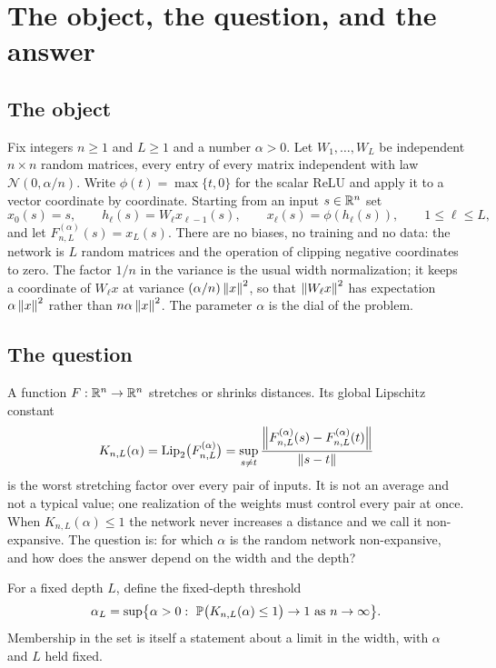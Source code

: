 \section{The object, the question, and the answer}
\label{sec:intro}

\subsection{The object}

Fix integers $n\ge 1$ and $L\ge 1$ and a number $\alpha>0$. Let $W_1,\dots,W_L$ be independent $n\times n$ random matrices, every entry of every matrix independent with law $\mathcal N(0,\alpha/n)$. Write $\phi(t)=\max\{t,0\}$ for the scalar ReLU and apply it to a vector coordinate by coordinate. Starting from an input $s\in\mathbb{R}^n$ set
\begin{equation}\label{eq:forward}
x_0(s)=s,\qquad h_\ell(s)=W_\ell x_{\ell-1}(s),\qquad x_\ell(s)=\phi(h_\ell(s)),\qquad 1\le \ell\le L,
\end{equation}
and let $F^{(\alpha)}_{n,L}(s)=x_L(s)$. There are no biases, no training and no data: the network is $L$ random matrices and the operation of clipping negative coordinates to zero. The factor $1/n$ in the variance is the usual width normalization; it keeps a coordinate of $W_\ell x$ at variance $(\alpha/n)\left\lVert x\right\rVert^2$, so that $\left\lVert W_\ell x\right\rVert^2$ has expectation $\alpha\left\lVert x\right\rVert^2$ rather than $n\alpha\left\lVert x\right\rVert^2$. The parameter $\alpha$ is the dial of the problem.

\subsection{The question}

A function $F:\mathbb{R}^n\to\mathbb{R}^n$ stretches or shrinks distances. Its global Lipschitz constant
\begin{equation}\label{eq:Kdef}
K_{n,L}(\alpha)=\operatorname{Lip}_2\bigl(F^{(\alpha)}_{n,L}\bigr)=\sup_{s\ne t}\frac{\left\lVert F^{(\alpha)}_{n,L}(s)-F^{(\alpha)}_{n,L}(t)\right\rVert}{\left\lVert s-t\right\rVert}
\end{equation}
is the worst stretching factor over every pair of inputs. It is not an average and not a typical value; one realization of the weights must control every pair at once. When $K_{n,L}(\alpha)\le 1$ the network never increases a distance and we call it non-expansive. The question is: for which $\alpha$ is the random network non-expansive, and how does the answer depend on the width and the depth?

For a fixed depth $L$, define the fixed-depth threshold
\begin{equation}\label{eq:alphaL}
\alpha_L=\sup\bigl\{\alpha>0:\ \mathbb{P}\bigl(K_{n,L}(\alpha)\le 1\bigr)\to 1\ \text{as } n\to\infty\bigr\}.
\end{equation}
Membership in the set is itself a statement about a limit in the width, with $\alpha$ and $L$ held fixed.

